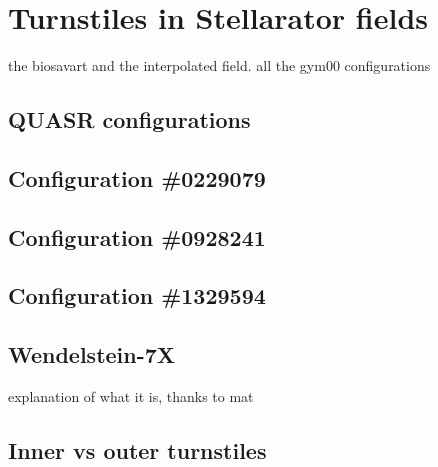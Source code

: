 

\chapter{Turnstiles in Stellarator fields}

the biosavart and the interpolated field. all the gym00 configurations

\section{QUASR configurations}

\section{Configuration \#0229079}

\section{Configuration \#0928241}

\section{Configuration \#1329594}

\section{Wendelstein-7X}
explanation of what it is, thanks to mat

\section{Inner vs outer turnstiles}

